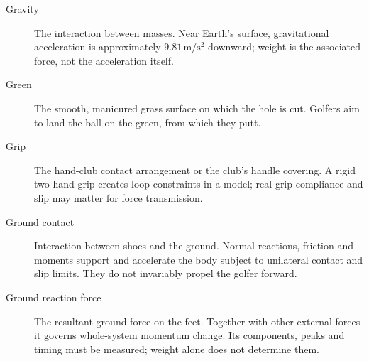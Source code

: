 \begin{description}
\item[Gravity] The interaction between masses. Near Earth's surface, gravitational acceleration is approximately $9.81\,\mathrm{m/s^2}$ downward; weight is the associated force, not the acceleration itself.

\item[Green] The smooth, manicured grass surface on which the hole is cut. Golfers aim to land the ball on the green, from which they putt.

\item[Grip] The hand-club contact arrangement or the club's handle covering. A rigid two-hand grip creates loop constraints in a model; real grip compliance and slip may matter for force transmission.

\item[Ground contact] Interaction between shoes and the ground. Normal reactions, friction and moments support and accelerate the body subject to unilateral contact and slip limits. They do not invariably propel the golfer forward.

\item[Ground reaction force] The resultant ground force on the feet. Together with other external forces it governs whole-system momentum change. Its components, peaks and timing must be measured; weight alone does not determine them.

\end{description}
